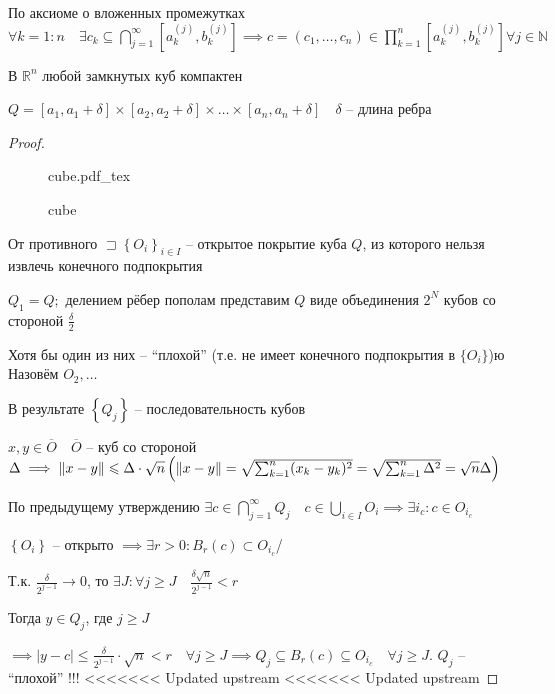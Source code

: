 \documentclass{book}
\newcommand\N{\ensuremath{\mathbb{N}}}
\newcommand\R{\ensuremath{\mathbb{R}}}
\newcommand{\ov}[1]{\overline{#1}}
\theoremstyle{definition}
\newcommand{\incfig}[1]{%
    \def\svgwidth{\columnwidth}
    {#1.pdf_tex}
}
\begin{document}
По аксиоме о вложенных промежутках $ \forall k=1:n\quad \exists c_k \subseteq \bigcap\limits_{j=1}^{\infty } [a_k^{\left( j \right) }, b_k^{\left( j \right) }] \implies  c = \left( c_1, \ldots, c_n \right) \in \prod_{k=1}^{n} [a_k^{\left( j \right) }, b_k^{\left( j \right) } ] \forall j\in \N $

\begin{theorem}
     В $ \R^n$ любой замкнутых куб компактен 

    $Q = [a_1, a_1+\delta] \times [a_2, a_2+\delta] \times \ldots\times [a_n, a_n+\delta]\quad \delta$ -- длина ребра
\end{theorem}
\begin{proof}
\begin{figure}[ht]
    \centering
    \incfig{cube}
    \caption{cube}
    \label{fig:cube}
\end{figure}

От противного $\sqsupset \left\{ O_i \right\} _{i\in I}$ -- открытое покрытие куба $Q$, из которого нельзя извлечь конечного подпокрытия

 $Q_1 = Q;$ делением рёбер пополам представим $Q$  виде объединения  $2^N$ кубов со стороной  $\frac{\delta}{2}$ 

 Хотя бы один из них -- ``плохой'' (т.е. не имеет конечного подпокрытия в $\{O_i\}$)ю Назовём  $O_2, \ldots$

 В результате $\left\{ Q_j \right\} $ -- последовательность кубов

 $x, y\in \ov O\quad \ov O$ -- куб со стороной  $\Delta \implies  \|x-y\| \leqslant \Delta \cdot  \sqrt{n} \\ \left( \|x-y\| = \sqrt{\sum_{k=1}^{n} (x_k-y_k)^2} = \sqrt{\sum_{k=1}^{n} \Delta^2} = \sqrt{n} \Delta   \right) $

 По предыдущему утверждению $\exists c\in \bigcap\limits_{j=1}^{\infty } Q_j \quad c\in \bigcup\limits_{i \in  I} O_i \implies \exists i_c: c\in O_{i_c}$

 $\left\{ O_i \right\} $ -- открыто $\implies  \exists r>0: B_r(c)\subset O_{i_c}$/

 Т.к. $\frac{\delta}{2^{j-1}} \to 0$, то $\exists J: \forall j\geqslant J\quad \frac{\delta \sqrt{n} }{2^{j-1}}<r$ 

 Тогда $y\in Q_j$, где $j \geqslant J$

 $\implies \left| y-c \right| \leqslant \frac{\delta}{2^{j-1}}\cdot \sqrt{n}<r\quad \forall j\geqslant J\implies  Q_j\subseteq B_r(c)\subseteq O_{i_c}\quad \forall j\geqslant J $. $Q_j$ -- ``плохой'' !!!
<<<<<<< Updated upstream
<<<<<<< Updated upstream
\end{proof}
\end{document}
